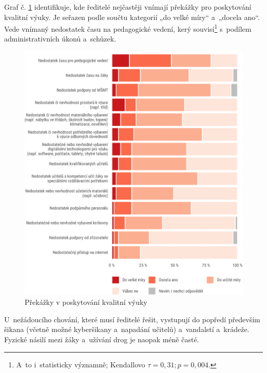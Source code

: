 \documentclass[12pt,a4paper,]{report}
\begin{document}
Graf č. \ref{fig:obstacles} identifikuje, kde ředitelé nejčastěji vnímají překážky pro poskytování kvalitní výuky. Je seřazen podle součtu kategorií „do velké míry`` a~„docela ano``. Vede vnímaný nedostatek času na pedagogické vedení, kerý souvisí\footnote{A~to i~statisticky významně; Kendallovo \(\tau = 0,31; p = 0,004\).} s~podílem administrativních úkonů a~schůzek.

\begin{figure}

{\centering \includegraphics[width=\textwidth]{figs/obstacles-1} 

}

\caption{Překážky v poskytování kvalitní výuky}\label{fig:obstacles}
\end{figure}

U~nežádoucího chování, které musí ředitelé řešit, vystupují do popředí především šikana (včetně možné kyberšikany a~napadání učitelů) a~vandalstí a~krádeže. Fyzické násilí mezi žáky a~užívání drog je naopak méně časté.
\end{document}
